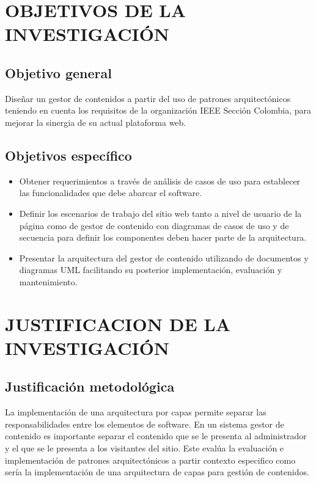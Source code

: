 \newpage

\section{OBJETIVOS DE LA INVESTIGACIÓN}

\subsection{Objetivo general}

Diseñar un gestor de contenidos a partir del uso de patrones arquitectónicos teniendo en cuenta los requisitos de la organización IEEE Sección Colombia, para mejorar la sinergia de su actual plataforma web.

\subsection{Objetivos específico}
	
\begin{itemize}
	\item Obtener requerimientos a través de análisis de casos de uso para establecer las funcionalidades que debe abarcar el software.
	\item Definir los escenarios de trabajo del sitio web tanto a nivel de usuario de la página como de gestor de contenido con diagramas de casos de uso y de secuencia para definir los componentes deben hacer parte de la arquitectura.
	\item Presentar la arquitectura del gestor de contenido utilizando de documentos y diagramas UML facilitando su posterior implementación, evaluación y mantenimiento.
\end{itemize}

\newpage

\section{JUSTIFICACION DE LA INVESTIGACIÓN}

\subsection{Justificación metodológica}

La implementación de una arquitectura por capas permite separar las responsabilidades entre los elementos de software. En un sistema gestor de contenido es importante separar el contenido que se le presenta al administrador y el que se le presenta a los visitantes del sitio. Este evalúa la evaluación e implementación de patrones arquitectónicos a partir contexto especifico como sería la implementación de una arquitectura de capas para gestión de contenidos.

